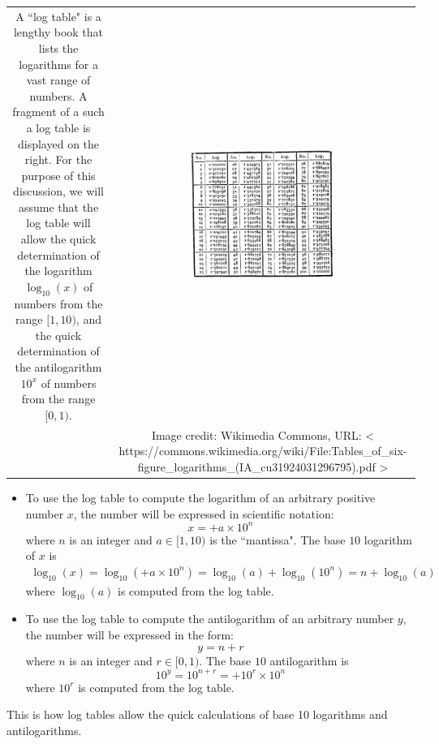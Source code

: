 \documentclass{article}
\begin{document}
\begin{tabular}{cc}
\parbox{0.5\textwidth}{
A ``log table" is a lengthy book that lists the logarithms for a vast range of numbers. A fragment of a such a log table is displayed on the right. For the purpose of this discussion, we will assume that the log table will allow the quick determination of the logarithm \(\log_{10}(x)\) of numbers from the range \([1, 10)\), and the quick determination of the antilogarithm \(10^x\) of numbers from the range \([0, 1)\). 
} & \parbox{0.5\textwidth}{
\includegraphics[width = 0.5\textwidth]{Log_table_fragment.png}
} \\
& \parbox{0.5\textwidth}{\footnotesize Image credit: Wikimedia Commons, URL: 
{\textless
https://commons.wikimedia.org/wiki/File:Tables\_of\_six-figure\_logarithms\_(IA\_cu31924031296795).pdf
\textgreater}
}
\end{tabular} 
\begin{itemize}
\item To use the log table to compute the logarithm of an arbitrary positive number \(x\), the number will be expressed in scientific notation: 
\[x = +a \times 10^n\] where \(n\) is an integer and \(a \in [1, 10)\) is the ``mantissa". 
The base \(10\) logarithm of \(x\) is 
\begin{align*}
\log_{10}(x) = \log_{10}(+a \times 10^n) = \log_{10}(a) + \log_{10}(10^n) = n + \log_{10}(a)
\end{align*} 
where \(\log_{10}(a)\) is computed from the log table. 
\item To use the log table to compute the antilogarithm of an arbitrary number \(y\), the number will be expressed in the form: 
\[y = n + r\] where \(n\) is an integer and \(r \in [0, 1)\). 
The base \(10\) antilogarithm is 
\[10^y = 10^{n+r} = +10^r \times 10^n\]
where \(10^r\) is computed from the log table.
\end{itemize}
This is how log tables allow the quick calculations of base 10 logarithms and antilogarithms. 
\end{document}
